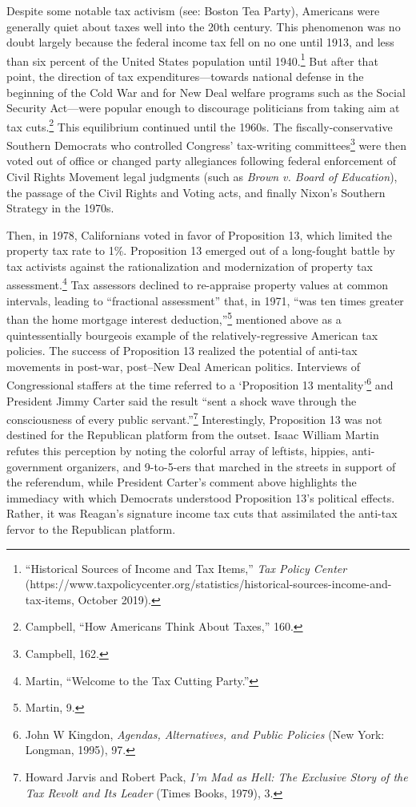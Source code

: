 \documentclass[12pt,oneside]{psthesis}
\begin{document}
Despite some notable tax activism (see: Boston Tea Party), Americans were generally quiet about taxes well into the 20th century.
This phenomenon was no doubt largely because the federal income tax fell on no one until 1913, and less than six percent of the United States population until 1940.\footnote{``Historical Sources of Income and Tax Items,'' \emph{Tax Policy Center} (https://www.taxpolicycenter.org/statistics/historical-sources-income-and-tax-items, October 2019).}
But after that point, the direction of tax expenditures---towards national defense in the beginning of the Cold War and for New Deal welfare programs such as the Social Security Act---were popular enough to discourage politicians from taking aim at tax cuts.\footnote{Campbell, ``How Americans Think About Taxes,'' 160.}
This equilibrium continued until the 1960s.
The fiscally-conservative Southern Democrats who controlled Congress' tax-writing committees\footnote{Campbell, 162.} were then voted out of office or changed party allegiances following federal enforcement of Civil Rights Movement legal judgments (such as \emph{Brown v. Board of Education}), the passage of the Civil Rights and Voting acts, and finally Nixon's Southern Strategy in the 1970s.

Then, in 1978, Californians voted in favor of Proposition 13, which limited the property tax rate to 1\%.
Proposition 13 emerged out of a long-fought battle by tax activists against the rationalization and modernization of property tax assessment.\footnote{Martin, ``Welcome to the Tax Cutting Party.''}
Tax assessors declined to re-appraise property values at common intervals, leading to ``fractional assessment'' that, in 1971, ``was ten times greater than the home mortgage interest deduction,''\footnote{Martin, 9.} mentioned above as a quintessentially bourgeois example of the relatively-regressive American tax policies.
The success of Proposition 13 realized the potential of anti-tax movements in post-war, post--New Deal American politics.
Interviews of Congressional staffers at the time referred to a `Proposition 13 mentality'\footnote{John W Kingdon, \emph{Agendas, Alternatives, and Public Policies} (New York: Longman, 1995), 97.} and President Jimmy Carter said the result ``sent a shock wave through the consciousness of every public servant.''\footnote{Howard Jarvis and Robert Pack, \emph{I'm Mad as Hell: The Exclusive Story of the Tax Revolt and Its Leader} (Times Books, 1979), 3.}
Interestingly, Proposition 13 was not destined for the Republican platform from the outset.
Isaac William Martin refutes this perception by noting the colorful array of leftists, hippies, anti-government organizers, and 9-to-5-ers that marched in the streets in support of the referendum, while President Carter's comment above highlights the immediacy with which Democrats understood Proposition 13's political effects.
Rather, it was Reagan's signature income tax cuts that assimilated the anti-tax fervor to the Republican platform.
\end{document}
